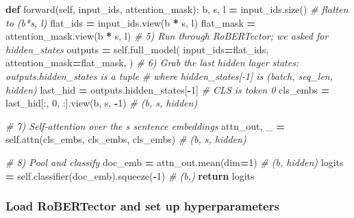 \documentclass[
]{article}
\newenvironment{Shaded}{\begin{snugshade}}{\end{snugshade}}
\newcommand{\CommentTok}[1]{\textcolor[rgb]{0.56,0.35,0.01}{\textit{#1}}}
\newcommand{\ControlFlowTok}[1]{\textcolor[rgb]{0.13,0.29,0.53}{\textbf{#1}}}
\newcommand{\DecValTok}[1]{\textcolor[rgb]{0.00,0.00,0.81}{#1}}
\newcommand{\KeywordTok}[1]{\textcolor[rgb]{0.13,0.29,0.53}{\textbf{#1}}}
\newcommand{\NormalTok}[1]{#1}
\newcommand{\OperatorTok}[1]{\textcolor[rgb]{0.81,0.36,0.00}{\textbf{#1}}}
\newcommand{\VariableTok}[1]{\textcolor[rgb]{0.00,0.00,0.00}{#1}}
\begin{document}
\begin{Shaded}
\begin{Highlighting}[]
    \KeywordTok{def}\NormalTok{ forward(}\VariableTok{self}\NormalTok{, input\_ids, attention\_mask):}
\NormalTok{        b, s, l }\OperatorTok{=}\NormalTok{ input\_ids.size()}
        \CommentTok{\# flatten to (b*s, l)}
\NormalTok{        flat\_ids   }\OperatorTok{=}\NormalTok{ input\_ids.view(b }\OperatorTok{*}\NormalTok{ s, l)}
\NormalTok{        flat\_mask  }\OperatorTok{=}\NormalTok{ attention\_mask.view(b }\OperatorTok{*}\NormalTok{ s, l)}
        \CommentTok{\# 5) Run through RoBERTector; we asked for hidden\_states}
\NormalTok{        outputs }\OperatorTok{=} \VariableTok{self}\NormalTok{.full\_model(}
\NormalTok{            input\_ids}\OperatorTok{=}\NormalTok{flat\_ids,}
\NormalTok{            attention\_mask}\OperatorTok{=}\NormalTok{flat\_mask,}
\NormalTok{        )}
        \CommentTok{\# 6) Grab the last hidden layer states: outputs.hidden\_states is a tuple}
        \CommentTok{\#    where hidden\_states[{-}1] is (batch, seq\_len, hidden)}
\NormalTok{        last\_hid }\OperatorTok{=}\NormalTok{ outputs.hidden\_states[}\OperatorTok{{-}}\DecValTok{1}\NormalTok{]        }
        \CommentTok{\# CLS is token 0}
\NormalTok{        cls\_embs }\OperatorTok{=}\NormalTok{ last\_hid[:, }\DecValTok{0}\NormalTok{, :].view(b, s, }\OperatorTok{{-}}\DecValTok{1}\NormalTok{)  }\CommentTok{\# (b, s, hidden)}

        \CommentTok{\# 7) Self‑attention over the s sentence embeddings}
\NormalTok{        attn\_out, \_ }\OperatorTok{=} \VariableTok{self}\NormalTok{.attn(cls\_embs, cls\_embs, cls\_embs)  }\CommentTok{\# (b, s, hidden)}

        \CommentTok{\# 8) Pool and classify}
\NormalTok{        doc\_emb }\OperatorTok{=}\NormalTok{ attn\_out.mean(dim}\OperatorTok{=}\DecValTok{1}\NormalTok{)                       }\CommentTok{\# (b, hidden)}
\NormalTok{        logits }\OperatorTok{=} \VariableTok{self}\NormalTok{.classifier(doc\_emb).squeeze(}\OperatorTok{{-}}\DecValTok{1}\NormalTok{)        }\CommentTok{\# (b,)}
        \ControlFlowTok{return}\NormalTok{ logits}
\end{Highlighting}
\end{Shaded}

\subsubsection{Load RoBERTector and set up
hyperparameters}\label{load-robertector-and-set-up-hyperparameters}
\end{document}

